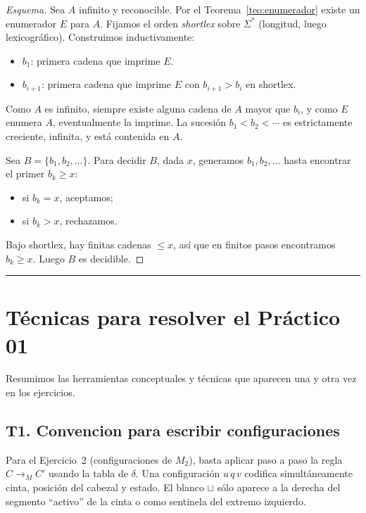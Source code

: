 \documentclass[11pt,a4paper]{article}
\theoremstyle{plain}
\theoremstyle{definition}
\theoremstyle{remark}
\newcommand{\Sstar}{\Sigma^{*}}
\newcommand{\blank}{\sqcup}
\begin{document}
\begin{proof}[Esquema]
Sea $A$ infinito y reconocible. Por el Teorema~\ref{teo:enumerador} existe
un enumerador $E$ para $A$. Fijamos el orden \emph{shortlex} sobre $\Sstar$
(longitud, luego lexicogr\'afico). Construimos inductivamente:
\begin{itemize}
  \item $b_1$: primera cadena que imprime $E$.
  \item $b_{i+1}$: primera cadena que imprime $E$ con $b_{i+1}>b_i$ en
        shortlex.
\end{itemize}
Como $A$ es infinito, siempre existe alguna cadena de $A$ mayor que $b_i$,
y como $E$ enumera $A$, eventualmente la imprime. La sucesi\'on
$b_1<b_2<\cdots$ es estrictamente creciente, infinita, y est\'a contenida
en $A$.

Sea $B=\{b_1,b_2,\dots\}$. Para decidir $B$, dada $x$, generamos $b_1,b_2,\dots$ hasta encontrar el primer $b_k\ge x$:
\begin{itemize}
  \item si $b_k=x$, aceptamos;
  \item si $b_k>x$, rechazamos.
\end{itemize}
Bajo shortlex, hay finitas cadenas $\le x$, as\'i que en finitos pasos
encontramos $b_k\ge x$. Luego $B$ es decidible.
\end{proof}

\bigskip\hrule\bigskip

\section{T\'ecnicas para resolver el Pr\'actico 01}
\label{sec:tecnicas}

Resumimos las herramientas conceptuales y t\'ecnicas que aparecen una y
otra vez en los ejercicios.

\subsection*{T1. Convencion para escribir configuraciones}

Para el Ejercicio~2 (configuraciones de $M_2$), basta aplicar paso a paso
la regla $C\to_M C'$ usando la tabla de $\delta$. Una configuraci\'on
$u\,q\,v$ codifica simult\'aneamente cinta, posici\'on del cabezal y estado.
El blanco $\blank$ s\'olo aparece a la derecha del segmento ``activo'' de la
cinta o como sentinela del extremo izquierdo.
\end{document}
